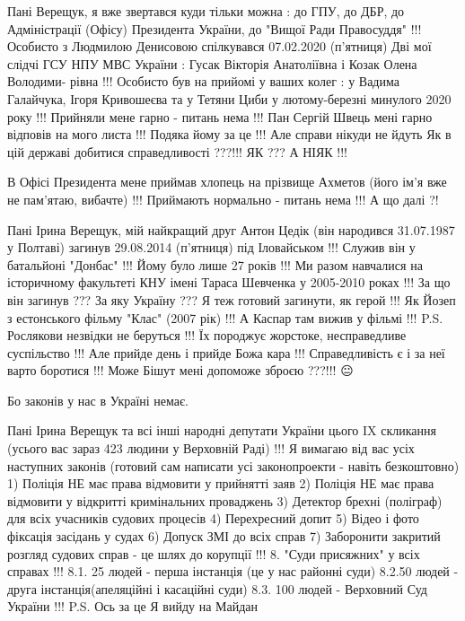 \begin{itemize}
\begin{itemize}
Пані Верещук, я вже звертався куди тільки можна : до ГПУ, до ДБР, до
Адміністрації (Офісу) Президента України, до "Вищої Ради Правосуддя" !!!
Особисто з Людмилою Денисовою спілкувався 07.02.2020 (п'ятниця) Дві мої слідчі
ГСУ НПУ МВС України : Гусак Вікторія Анатоліївна і Козак Олена Володими- рівна
!!! Особисто був на прийомі у ваших колег : у Вадима Галайчука, Ігоря
Кривошеєва та у Тетяни Циби у лютому-березні минулого 2020 року !!! Прийняли
мене гарно - питань нема !!! Пан Сергій Швець мені гарно відповів на мого листа
!!! Подяка йому за це !!! Але справи нікуди не йдуть Як в цій державі добитися
справедливості ???!!! ЯК ??? А НІЯК !!!

В Офісі Президента мене приймав хлопець на прізвище Ахметов (його ім'я вже не
пам'ятаю, вибачте) !!! Приймають нормально - питань нема !!! А що далі ?!

Пані Ірина Верещук, мій найкращий друг Антон Цедік (він народився 31.07.1987 у
Полтаві) загинув 29.08.2014 (п'ятниця) під Іловайськом !!! Служив він у
батальйоні "Донбас" !!! Йому було лише 27 років !!! Ми разом навчалися на
історичному факультеті КНУ імені Тараса Шевченка у 2005-2010 роках !!! За що
він загинув ??? За яку Україну ??? Я теж готовий загинути, як герой !!! Як
Йозеп з естонського фільму "Клас" (2007 рік) !!!  А Каспар там вижив у фільмі
!!!  P.S. Рослякови незвідки не беруться !!! Їх породжує жорстоке,
несправедливе суспільство !!!  Але прийде день і прийде Божа кара !!!
Справедливість є і за неї варто боротися !!! Може Бішут мені допоможе зброєю
???!!! 😐

Бо законів у нас в Україні немає.

Пані Ірина Верещук та всі інші народні депутати України цього IX скликання
(усього вас зараз 423 людини у Верховній Раді) !!!  Я вимагаю від вас усіх
наступних законів (готовий сам написати усі законопроекти - навіть безкоштовно)
1) Поліція НЕ має права відмовити у прийнятті заяв 2) Поліція НЕ має права
відмовити у відкритті кримінальних проваджень 3) Детектор брехні (поліграф)
для всіх учасників судових процесів 4) Перехресний допит 5) Відео і фото
фіксація засідань у судах 6) Допуск ЗМІ до всіх справ 7) Заборонити закритий
розгляд судових справ - це шлях до корупції !!!  8. "Суди присяжних" у всіх
справах !!!  8.1. 25 людей - перша інстанція (це у нас районні суди) 8.2.50
людей - друга інстанція(апеляційні і касаційні суди) 8.3. 100 людей - Верховний
Суд України !!! P.S. Ось за це Я вийду на Майдан

 

\end{itemize}
\end{itemize}
